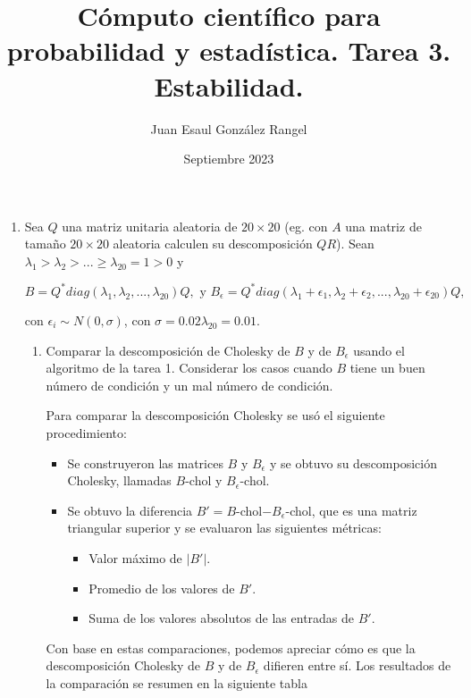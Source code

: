 \documentclass{article}
\title{Cómputo científico para probabilidad y estadística. Tarea 3.\\
Estabilidad.}
\author{Juan Esaul González Rangel}
\date{Septiembre 2023}
\begin{document}
\maketitle


\begin{enumerate}

    \item Sea $Q$ una matriz unitaria aleatoria de $20 \times 20$ (eg. con $A$ una 
    matriz de tamaño $20 \times 20$ aleatoria calculen su descomposición $QR$). 
    Sean $\lambda_1 > \lambda_2 > ... \ge \lambda_{20} = 1 > 0$ y 
    
    \[B = Q^*diag(\lambda_1, \lambda_2, ..., \lambda_{20})Q, \text{ y } B_\epsilon 
    = Q^*diag(\lambda_1+\epsilon_1, \lambda_2+\epsilon_2, ..., \lambda_{20}+\epsilon_{20})Q,\]

con $\epsilon_i \sim N (0, \sigma)$, con $\sigma = 0.02\lambda_{20} = 0.01$.

\begin{enumerate}
    \item Comparar la descomposición de Cholesky de $B$ y de $B_\epsilon$ usando el 
    algoritmo de la tarea 1. Considerar los casos cuando $B$ tiene un buen número de 
    condición y un mal número de condición.

    Para comparar la descomposición Cholesky se usó el siguiente procedimiento:

    \begin{itemize}
        \item Se construyeron las matrices $B$ y $B_\epsilon$ y se obtuvo su descomposición 
        Cholesky, llamadas $B$-chol y $B_\epsilon$-chol.
        \item Se obtuvo la diferencia $B' = B$-chol$-B_\epsilon$-chol, que es una matriz triangular 
        superior y se evaluaron las siguientes métricas:
        \begin{itemize}
            \item Valor máximo de $|B'|$.
            \item Promedio de los valores de $B'$.
            \item Suma de los valores absolutos de las entradas de $B'$.
        \end{itemize}
    \end{itemize}

    Con base en estas comparaciones, podemos apreciar cómo es que la descomposición Cholesky de
    $B$ y de $B_\epsilon$ difieren entre sí. Los resultados de la comparación se resumen en 
    la siguiente tabla


\end{enumerate}
\end{enumerate}
\end{document}
